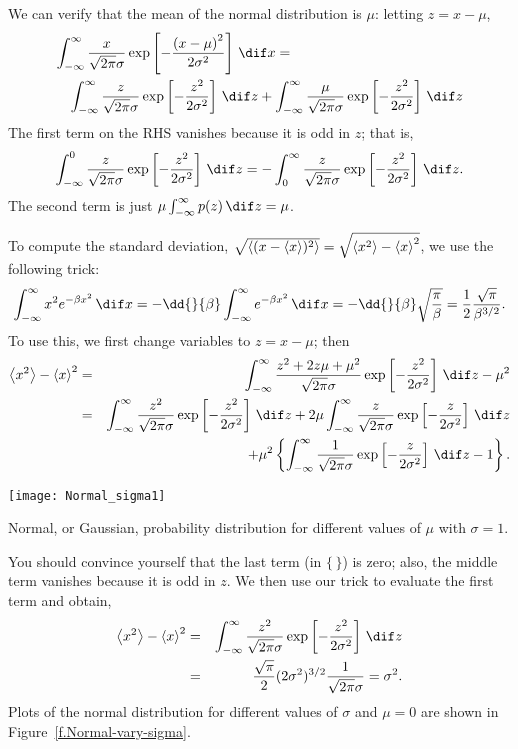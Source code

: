 We can verify that the mean of the normal distribution is $\mu$: letting $z = x-\mu$,
\begin{eqnarray*}
\lefteqn{\int_{-\infty}^{\infty} \frac{x}{\sqrt{2\pi}\sigma} \exp\left[-\frac{\left(x-\mu\right)^{2}}{2\sigma^{2}}\right] \,\dif x = }  \\
	&& \int_{-\infty}^{\infty} \frac{z}{\sqrt{2\pi}\sigma} \exp\left[-\frac{z^{2}}{2\sigma^{2}}\right] \,\dif z + \int_{-\infty}^{\infty} \frac{\mu}{\sqrt{2\pi}\sigma} \exp\left[-\frac{z^{2}}{2\sigma^{2}}\right] \,\dif z 
\end{eqnarray*}
The first term on the RHS vanishes because it is odd in $z$; that is,
\[ 
	\int_{-\infty}^{0} \frac{z}{\sqrt{2\pi}\sigma} \exp\left[-\frac{z^{2}}{2\sigma^{2}}\right] \,\dif z = -\int_{0}^{\infty} \frac{z}{\sqrt{2\pi}\sigma} \exp\left[-\frac{z^{2}}{2\sigma^{2}}\right] \,\dif z.
\]
The second term is just $\mu \int_{-\infty}^{\infty} p(z)\,\dif z = \mu$.

To compute the standard deviation, $\sqrt{\left\langle(x-\left\langle x\right\rangle)^{2}\right\rangle} = \sqrt{\left\langle x^{2}\right\rangle-\left\langle x\right\rangle^{2}}$, 
we use the following trick:
\[
	\int_{-\infty}^{\infty}x^{2}e^{-\beta x^{2}}\,\dif x 
		= -\dd{}{\beta}\int_{-\infty}^{\infty}e^{-\beta x^{2}}\,\dif x = -\dd{}{\beta}\sqrt{\frac{\pi}{\beta}} = \frac{1}{2}\frac{\sqrt{\pi}}{\beta^{3/2}}.
\]
To use this, we first change variables to $z = x-\mu$; then
\begin{eqnarray*}
	\mean{x^{2}} - \mean{x}^{2} &=& \int_{-\infty}^{\infty}\frac{z^{2}+2z\mu+\mu^{2}}{\sqrt{2\pi}\sigma} \exp\left[-\frac{z^{2}}{2\sigma^{2}}\right]\,\dif z - \mu^{2}\\
		&=& \int_{-\infty}^{\infty}\frac{z^{2}}{\sqrt{2\pi}\sigma} \exp\left[-\frac{z^{2}}{2\sigma^{2}}\right]\,\dif z + 2\mu \int_{-\infty}^{\infty}\frac{z}{\sqrt{2\pi}\sigma} \exp\left[-\frac{z}{2\sigma^{2}}\right]\,\dif z \\
		&& + \mu^{2}\left\{ \int_{-\infty}^{\infty} \frac{1}{\sqrt{2\pi}\sigma} \exp\left[-\frac{z}{2\sigma^{2}}\right]\,\dif z - 1\right\}.
\end{eqnarray*}
\begin{marginfigure}
\texttt{[image: Normal\_sigma1]}
\caption[Normal distributions with different means]{Normal, or Gaussian, probability distribution for different values of $\mu$ with $\sigma=1$.}
\label{f.Normal-vary-mu}
\end{marginfigure}
\noindent You should convince yourself that the last term (in $\{\,\}$) is zero; also, the middle term vanishes because it is odd in $z$.  We then use our trick to evaluate the first term and obtain,
\begin{eqnarray*}
	\mean{x^{2}} - \mean{x}^{2} &=& \int_{-\infty}^{\infty}\frac{z^{2}}{\sqrt{2\pi}\sigma} \exp\left[-\frac{z^{2}}{2\sigma^{2}}\right]\,\dif z \\
	&=& \frac{\sqrt{\pi}}{2}(2\sigma^{2})^{3/2}\frac{1}{\sqrt{2\pi}\sigma} = \sigma^{2}.
\end{eqnarray*}
Plots of the normal distribution for different values of $\sigma$ and $\mu=0$ are shown in Figure~\ref{f.Normal-vary-sigma}.

